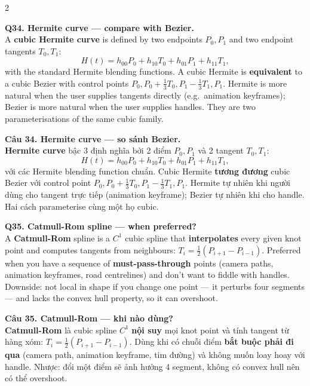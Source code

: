 \begin{paracol}{2}
\switchcolumn*

\textbf{Q34. Hermite curve — compare with Bezier.}\\
A \textbf{cubic Hermite curve} is defined by two endpoints $P_0, P_1$ and two endpoint tangents $T_0, T_1$:
\[ H(t) = h_{00}P_0 + h_{10}T_0 + h_{01}P_1 + h_{11}T_1, \]
with the standard Hermite blending functions. A cubic Hermite is \textbf{equivalent} to a cubic Bezier with control points $P_0, P_0+\tfrac{1}{3}T_0, P_1-\tfrac{1}{3}T_1, P_1$. Hermite is more natural when the user supplies tangents directly (e.g.\ animation keyframes); Bezier is more natural when the user supplies handles. They are two parameterisations of the same cubic family.

\switchcolumn

\textbf{Câu 34. Hermite curve — so sánh Bezier.}\\
\textbf{Hermite curve} bậc 3 định nghĩa bởi 2 điểm $P_0, P_1$ và 2 tangent $T_0, T_1$:
\[ H(t) = h_{00}P_0 + h_{10}T_0 + h_{01}P_1 + h_{11}T_1, \]
với các Hermite blending function chuẩn. Cubic Hermite \textbf{tương đương} cubic Bezier với control point $P_0, P_0+\tfrac{1}{3}T_0, P_1-\tfrac{1}{3}T_1, P_1$. Hermite tự nhiên khi người dùng cho tangent trực tiếp (animation keyframe); Bezier tự nhiên khi cho handle. Hai cách parameterise cùng một họ cubic.

\switchcolumn*

\textbf{Q35. Catmull-Rom spline — when preferred?}\\
A \textbf{Catmull-Rom} spline is a $C^1$ cubic spline that \textbf{interpolates} every given knot point and computes tangents from neighbours: $T_i = \tfrac{1}{2}(P_{i+1}-P_{i-1})$. Preferred when you have a sequence of \textbf{must-pass-through} points (camera paths, animation keyframes, road centrelines) and don't want to fiddle with handles. Downside: not local in shape if you change one point — it perturbs four segments — and lacks the convex hull property, so it can overshoot.

\switchcolumn

\textbf{Câu 35. Catmull-Rom — khi nào dùng?}\\
\textbf{Catmull-Rom} là cubic spline $C^1$ \textbf{nội suy} mọi knot point và tính tangent từ hàng xóm: $T_i = \tfrac{1}{2}(P_{i+1}-P_{i-1})$. Dùng khi có chuỗi điểm \textbf{bắt buộc phải đi qua} (camera path, animation keyframe, tim đường) và không muốn loay hoay với handle. Nhược: đổi một điểm sẽ ảnh hưởng 4 segment, không có convex hull nên có thể overshoot.


\end{paracol}
